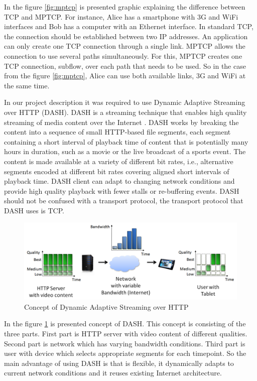 \documentclass{llncs}
\begin{document}
In the figure \ref{fig:mptcp} is presented graphic explaining the difference between TCP and MPTCP.  For instance, Alice has a smartphone with 3G and WiFi interfaces and Bob has a computer with an Ethernet interface. In standard TCP, the connection should be established between two IP addresses. An application can only create one TCP connection through a single link. MPTCP allows the connection to use several paths simultaneously. For this, MPTCP creates one TCP connection, subflow, over each path that needs to be used. So in the case from the figure \ref{fig:mptcp},  Alice can use both available links, 3G and WiFi at the same time.

In our project description it was required to use Dynamic Adaptive Streaming over HTTP (DASH). DASH is a streaming technique that enables high quality streaming of media content over the Internet \cite{DASH}. DASH works by breaking the content into a sequence of small HTTP-based file segments, each segment containing a short interval of playback time of content that is potentially many hours in duration, such as a movie or the live broadcast of a sports event. The content is made available at a variety of different bit rates, i.e., alternative segments encoded at different bit rates covering aligned short intervals of playback time. DASH client can adapt to changing network conditions and provide high quality playback with fewer stalls or re-buffering events. DASH should not be confused with a transport protocol, the transport protocol that DASH uses is TCP.

\begin{figure}[H]
\centering
\includegraphics[width=1.0\textwidth]{DASH.png}
\caption{\label{fig:dash} Concept of Dynamic Adaptive Streaming over HTTP}
\end{figure}

In the figure \ref{fig:dash} is presented concept of DASH. This concept is consisting of the three parts. First part is HTTP server with video content of different qualities. Second part is network which has varying bandwidth conditions. Third part is user with device which selects appropriate segments for each timepoint. So the main advantage of using DASH is that is flexible, it dynamically adapts to current network conditions and it reuses existing Internet architecture.
\end{document}
